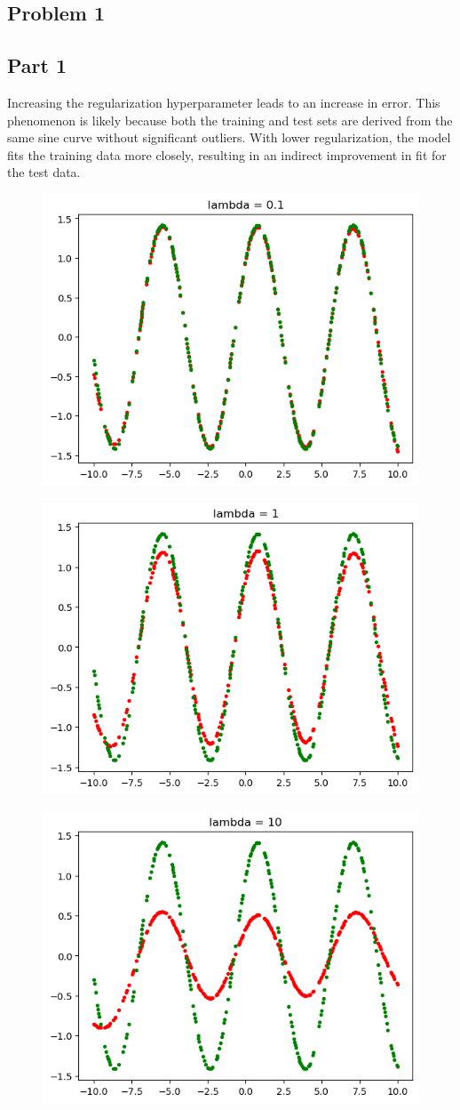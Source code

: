 \documentclass[a4paper,11pt]{article}
\begin{document}
\begin{mlsolution}

\section{Problem 1}

\subsection{Part 1}
Increasing the regularization hyperparameter leads to an increase in error. This phenomenon is likely because both the training and test sets are derived from the same sine curve without significant outliers. With lower regularization, the model fits the training data more closely, resulting in an indirect improvement in fit for the test data.
\begin{figure} [htb]
	\centering
	\includegraphics[width=0.5\linewidth]{1.1.png}
	\label{fig:1.1}
\end{figure}
\begin{figure} [htb]
	\centering
	\includegraphics[width=0.5\linewidth]{1.2.png}
	\label{fig:1.2}
\end{figure}
\begin{figure} [htb]
	\centering
	\includegraphics[width=0.5\linewidth]{1.3.png}

\end{figure}
\end{mlsolution}
\end{document}
